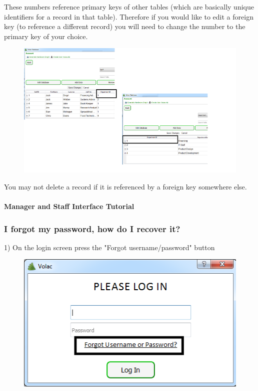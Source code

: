 These numbers reference primary keys of other tables (which are basically unique identifiers for a record in that table). Therefore if you would like to edit a foreign key (to reference a different record) you will need to change the number to the primary key of your choice.

\begin{figure}[H]
    \includegraphics[width=\textwidth]{./Manual/Images/foreign2.png}
\end{figure}

You may not delete a record if it is referenced by a foreign key somewhere else.

\paragraph{Manager and Staff Interface Tutorial}

\subsubsection{I forgot my password, how do I recover it?}\label{recoveraccount}

1) On the login screen press the "Forgot username/password" button

\begin{figure}[H]
    \includegraphics[width=\textwidth]{./Manual/Images/forgot.png}
\end{figure}

